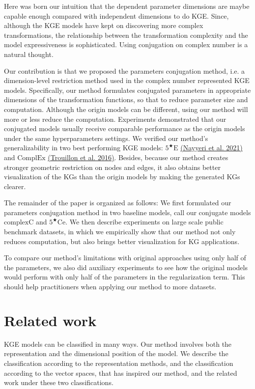 \documentclass[11pt]{article}
\begin{document}
Here was born our intuition that the dependent parameter dimensions are maybe capable enough compared with independent dimensions to do KGE. 
Since, although the KGE models have kept on discovering more complex transformations, the relationship between the transformation complexity and the model expressiveness is sophisticated.
Using conjugation on complex number is a natural thought.

Our contribution is that we proposed the parameters conjugation method, i.e. a dimension-level restriction method used in the complex number represented KGE models.
Specifically, our method formulates conjugated parameters in appropriate dimensions of the transformation functions, so that to reduce parameter size and computation.
Although the origin models can be different, using our method will more or less reduce the computation.
Experiments demonstrated that our conjugated models usually receive comparable performance as the origin models under the same hyperparameters settings.
We verified our method's generalizability in two best performing KGE models: $5^{\bigstar}\mathrm{E}$
\hyperlink{Nay21}{(Nayyeri et al. 2021)} and $\mathrm{ComplEx}$
\hyperlink{Tro16}{(Trouillon et al. 2016)}.
Besides, because our method creates stronger geometric restriction on nodes and edges, it also obtains better visualization of the KGs than the origin models by making the generated KGs clearer.

The remainder of the paper is organized as follows:
We first formulated our parameters conjugation method in two baseline models, call our conjugate models $\mathrm{complexC}$ and $5^{\bigstar}\mathrm{Ce}$.
We then describe experiments on large scale public benchmark datasets, in which we empirically show that our method not only reduces computation, but also brings better visualization for KG applications.

To compare our method's limitations with original approaches using only half of the parameters, we also did auxiliary experiments to see how the original models would perform with only half of the parameters in the regularization term. 
This should help practitioners when applying our method to more datasets.

\section{Related work}
KGE models can be classified in many ways. 
Our method involves both the representation and the dimensional position of the model. 
We describe the classification according to the representation methods, and the classification according to the vector spaces, that has inspired our method, and the related work under these two classifications.
\end{document}
